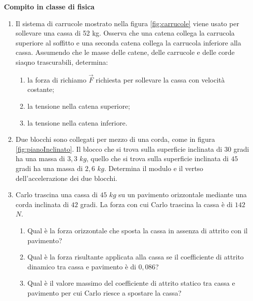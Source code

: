 \documentclass[14pt]{extarticle}
\begin{document}


\begin{center}
{\bf Compito in classe di fisica}
\end{center}


\begin{enumerate}

	\item Il sistema di carrucole mostrato nella figura \ref{fig:carrucole} viene usato per sollevare una cassa di 52 kg. Osserva che una catena collega la carrucola superiore al soffitto e una seconda catena collega la carrucola inferiore alla cassa. Assumendo che le masse delle catene, delle carrucole e delle corde siaqno trascurabili, determina: 
		\begin{enumerate}
			\item la forza di richiamo $\vec{F}$ richiesta per sollevare la cassa con velocità costante;
			\item la tensione nella catena superiore;
			\item la tensione nella catena inferiore.
		\end{enumerate}
		
	\item Due blocchi sono collegati per mezzo di una corda, come in figura \ref{fig:pianoInclinato}. Il blocco che si trova sulla superficie inclinata di $30$ gradi ha una massa di $3,3$ $kg$, quello che si trova sulla superficie inclinata di $45$ gradi ha una massa di $2,6$ $kg$. Determina il modulo e il vertso dell'accelerazione dei due blocchi.
	
	\item Carlo trascina una cassa di $45$ $kg$ su un pavimento orizzontale mediante una corda inclinata di $42$ gradi. La forza con cui Carlo trascina la cassa è di $142$ $N$. 
	\begin{enumerate}
		\item Qual è la forza orizzontale che sposta la cassa in assenza di attrito con il pavimento?
		\item Qual è la forza risultante applicata alla cassa se il coefficiente di attrito dinamico tra cassa e pavimento è di $0,086$?
		\item Qual è il valore massimo del coefficiente di attrito statico tra cassa e pavimento per cui Carlo riesce a spostare la cassa?
	\end{enumerate}
\end{enumerate}
\end{document}
